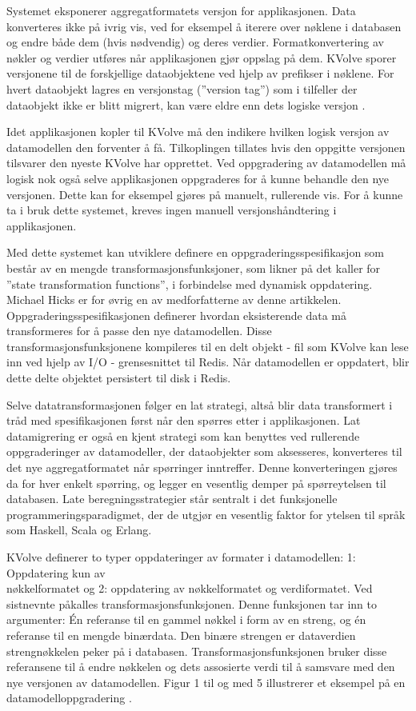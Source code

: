 Systemet eksponerer aggregatformatets versjon for applikasjonen. Data konverteres ikke på ivrig vis, ved for eksempel å iterere over nøklene i databasen og endre både dem (hvis nødvendig) og deres verdier. Formatkonvertering av nøkler og verdier utføres når applikasjonen gjør oppslag på dem. KVolve sporer versjonene til de forskjellige dataobjektene ved hjelp av prefikser i nøklene. For hvert dataobjekt lagres en versjonstag (''version tag'') som i tilfeller der dataobjekt ikke er blitt migrert, kan være eldre enn dets logiske versjon \citep{saur2016}.

Idet applikasjonen kopler til KVolve må den indikere hvilken logisk versjon av datamodellen den forventer å få. Tilkoplingen tillates hvis den oppgitte versjonen tilsvarer den nyeste KVolve har opprettet. Ved oppgradering av datamodellen må logisk nok også selve applikasjonen oppgraderes for å kunne behandle den nye versjonen. Dette kan for eksempel gjøres på manuelt, rullerende vis. For å kunne ta i bruk dette systemet, kreves ingen manuell versjonshåndtering i applikasjonen.

Med dette systemet kan utviklere definere en oppgraderingsspesifikasjon som består av en mengde transformasjonsfunksjoner, som likner på det \cite{hicks2005dsu} kaller for ''state transformation functions'', i forbindelse med dynamisk oppdatering. Michael Hicks er for øvrig en av medforfatterne av denne artikkelen. Oppgraderingsspesifikasjonen definerer hvordan eksisterende data må transformeres for å passe den nye datamodellen. Disse transformasjonsfunksjonene kompileres til en delt objekt - fil som KVolve kan lese inn ved hjelp av I/O - grensesnittet til Redis. Når datamodellen er oppdatert, blir dette delte objektet persistert til disk i Redis.

Selve datatransformasjonen følger en lat strategi, altså blir data transformert i tråd med spesifikasjonen først når den spørres etter i applikasjonen. Lat datamigrering er også en kjent strategi som kan benyttes ved rullerende oppgraderinger av datamodeller, der dataobjekter som aksesseres, konverteres til det nye aggregatformatet når spørringer inntreffer. Denne konverteringen gjøres da for hver enkelt spørring, og legger en vesentlig demper på spørreytelsen til databasen. Late beregningsstrategier står sentralt i det funksjonelle programmeringsparadigmet, der de utgjør en vesentlig faktor for ytelsen til språk som Haskell, Scala og Erlang.

KVolve definerer to typer oppdateringer av formater i datamodellen: 1: Oppdatering kun av \\ nøkkelformatet og 2: oppdatering av nøkkelformatet og verdiformatet. Ved sistnevnte påkalles transformasjonsfunksjonen. Denne funksjonen tar inn to argumenter: Én referanse til en gammel nøkkel i form av en streng, og én referanse til en mengde binærdata. Den binære strengen er dataverdien strengnøkkelen peker på i databasen. Transformasjonsfunksjonen bruker disse referansene til å endre nøkkelen og dets assosierte verdi til å samsvare med den nye versjonen av datamodellen. Figur 1 til og med 5 illustrerer et eksempel på en datamodelloppgradering \citep{saur2016}.

